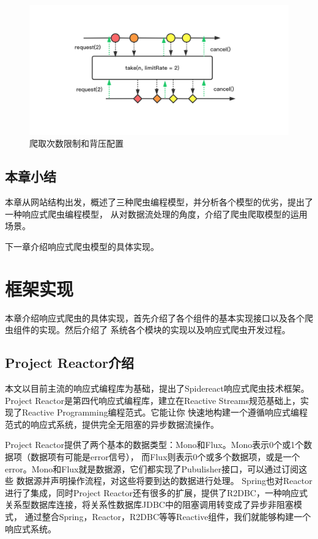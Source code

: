 \documentclass[master]{njuthesis}
\begin{document}
\begin{figure}[htbp]
\centering
\includegraphics[width= 1\textwidth]{pic/reactive-take.png}
\caption{爬取次数限制和背压配置}\label{fig:take}
\end{figure}


\section{本章小结}
本章从网站结构出发，概述了三种爬虫编程模型，并分析各个模型的优劣，提出了一种响应式爬虫编程模型，
从对数据流处理的角度，介绍了爬虫爬取模型的运用场景。

下一章介绍响应式爬虫模型的具体实现。



\chapter{框架实现}\label{Chapter_impletation}
本章介绍响应式爬虫的具体实现，首先介绍了各个组件的基本实现接口以及各个爬虫组件的实现。然后介绍了
系统各个模块的实现以及响应式爬虫开发过程。

\section{Project Reactor介绍}
本文以目前主流的响应式编程库为基础，提出了Spidereact响应式爬虫技术框架。
Project Reactor是第四代响应式编程库\cite{project_reactor}，建立在Reactive Streams规范基础上，实现了Reactive Programming编程范式。它能让你
快速地构建一个遵循响应式编程范式的响应式系统，提供完全无阻塞的异步数据流操作。

Project Reactor提供了两个基本的数据类型：Mono和Flux。Mono表示0个或1个数据项（数据项有可能是error信号），
而Flux则表示0个或多个数据项，或是一个error。Mono和Flux就是数据源，它们都实现了Pubulisher接口，可以通过订阅这些
数据源并声明操作流程，对这些将要到达的数据进行处理\cite{chen2018improving}。
Spring也对Reactor进行了集成，同时Project Reactor还有很多的扩展，提供了R2DBC，一种响应式关系型数据库连接，将关系性数据库JDBC中的阻塞调用转变成了异步非阻塞模式，
通过整合Spring，Reactor，R2DBC等等Reactive组件，我们就能够构建一个响应式系统。
\end{document}
